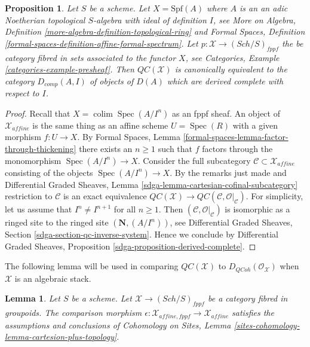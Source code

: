 \documentclass{stacks-project}
\theoremstyle{plain}
\newtheorem{proposition}[subsection]{Proposition}
\newtheorem{lemma}[subsection]{Lemma}
\theoremstyle{definition}
\theoremstyle{remark}
\numberwithin{equation}{subsection}
\def\colim{\mathop{\mathrm{colim}}\nolimits}
\def\Spec{\mathop{\mathrm{Spec}}}
\def\Sch{\mathit{Sch}}
\def\QCoh{\mathit{QCoh}}
\begin{document}
\begin{proposition}
\label{proposition-QC-derived-complete}
Let $S$ be a scheme. Let $X = \text{Spf}(A)$ where $A$ is an
an adic Noetherian topological $S$-algebra with ideal of definition $I$, see
More on Algebra, Definition \ref{more-algebra-definition-topological-ring}
and Formal Spaces, Definition
\ref{formal-spaces-definition-affine-formal-spectrum}.
Let $p : \mathcal{X} \to (\Sch/S)_{fppf}$
the be category fibred in sets associated to the functor $X$, see
Categories, Example \ref{categories-example-presheaf}.
Then $\mathit{QC}(\mathcal{X})$ is canonically equivalent to the
category $D_{comp}(A, I)$ of objects of $D(A)$ which are
derived complete with respect to $I$.
\end{proposition}

\begin{proof}
Recall that $X = \colim \Spec(A/I^n)$ as an fppf sheaf.
An object of $\mathcal{X}_{affine}$ is the same thing
as an affine scheme $U = \Spec(R)$ with a given morphism $f : U \to X$.
By Formal Spaces, Lemma \ref{formal-spaces-lemma-factor-through-thickening}
there exists an $n \geq 1$ such that
$f$ factors through the monomorphism $\Spec(A/I^n) \to X$.
Consider the full subcategory
$\mathcal{C} \subset \mathcal{X}_{affine}$ consisting of
the objects $\Spec(A/I^n) \to X$.
By the remarks just made and Differential Graded Sheaves, Lemma
\ref{sdga-lemma-cartesian-cofinal-subcategory}
restriction to $\mathcal{C}$ is an exact equivalence
$\mathit{QC}(\mathcal{X}) \to
\mathit{QC}(\mathcal{C}, \mathcal{O}|_\mathcal{C})$.
For simplicity, let us assume that
$I^n \not = I^{n + 1}$ for all $n \geq 1$.
Then $(\mathcal{C}, \mathcal{O}|_\mathcal{C})$ is isomorphic 
as a ringed site to the ringed site $(\mathbf{N}, (A/I^n))$, see
Differential Graded Sheaves, Section
\ref{sdga-section-qc-inverse-system}.
Hence we conclude by Differential Graded Sheaves, Proposition
\ref{sdga-proposition-derived-complete}.
\end{proof}

\noindent
The following lemma will be used in comparing $\mathit{QC}(\mathcal{X})$
to $D_\QCoh(\mathcal{O}_\mathcal{X})$ when $\mathcal{X}$ is an algebraic stack.

\begin{lemma}
\label{lemma-QC-compare-fppf}
Let $S$ be a scheme. Let $\mathcal{X} \to (\Sch/S)_{fppf}$ be a category
fibred in groupoids. The comparison morphism
$\epsilon : \mathcal{X}_{affine, fppf} \to \mathcal{X}_{affine}$
satisfies the assumptions and conclusions of Cohomology on Sites, Lemma
\ref{sites-cohomology-lemma-cartesion-plus-topology}.
\end{lemma}
\end{document}
